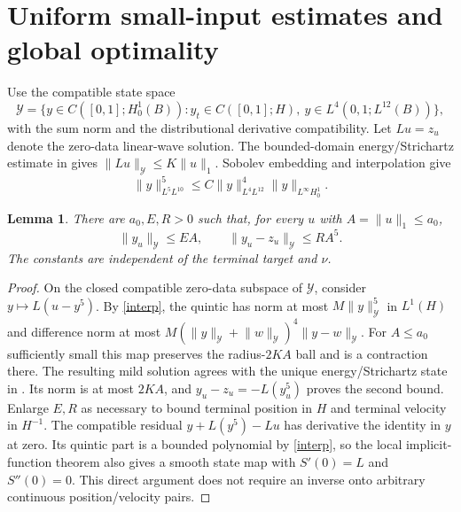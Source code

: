 \documentclass[11pt]{article}
\newtheorem{lemma}[theorem]{Lemma}
\newcommand{\Y}{\mathcal Y}
\newcommand{\norm}[1]{\lVert #1\rVert}
\begin{document}
\section{Uniform small-input estimates and global optimality}

Use the compatible state space
\[
 \Y=\{y\in C([0,1];H_0^1(B)):y_t\in C([0,1];H),\
                    y\in L^4(0,1;L^{12}(B))\},
\]
with the sum norm and the distributional derivative compatibility.
Let $L u=z_u$ denote the zero-data linear-wave solution. The bounded-domain
energy/Strichartz estimate in \cite[Lemma~2.9]{KM} gives
$\norm{Lu}_{\Y}\le K\norm u_1$. Sobolev embedding and interpolation give
\begin{equation}\label{interp}
 \norm y_{L^5L^{10}}^5\le
 C\norm y_{L^4L^{12}}^4\norm y_{L^\infty H_0^1}.
\end{equation}

\begin{lemma}\label{small}
There are $a_0,E,R>0$ such that, for every $u$ with $A=\norm u_1\le a_0$,
\begin{equation}\label{remainder}
 \norm{y_u}_{\Y}\le E A,\qquad
 \norm{y_u-z_u}_{\Y}\le R A^5.
\end{equation}
The constants are independent of the terminal target and $\nu$.
\end{lemma}
\begin{proof}
On the closed compatible zero-data subspace of $\Y$, consider
$y\mapsto L(u-y^5)$. By \eqref{interp}, the quintic has norm at most
$M\norm y_\Y^5$ in $L^1(H)$ and difference norm at most
$M(\norm y_\Y+\norm w_\Y)^4\norm{y-w}_\Y$.
For $A\le a_0$ sufficiently small this map preserves the radius-$2KA$
ball and is a contraction there. The resulting mild solution agrees with
the unique energy/Strichartz state in \cite{KM}. Its norm is at most
$2KA$, and $y_u-z_u=-L(y_u^5)$ proves the second bound. Enlarge $E,R$
as necessary to bound terminal position in $H$ and terminal velocity in
$H^{-1}$. The compatible residual $y+L(y^5)-Lu$ has derivative the identity
in $y$ at zero. Its quintic part is a bounded polynomial by
\eqref{interp}, so the local implicit-function theorem also gives a
smooth state map with $S'(0)=L$ and $S''(0)=0$.
This direct argument does not require an inverse onto arbitrary
continuous position/velocity pairs.
\end{proof}
\end{document}
